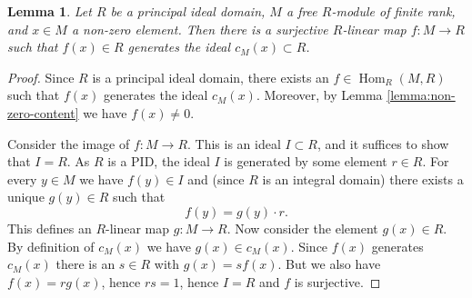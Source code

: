 \documentclass[11pt]{amsbook}
\DeclareMathOperator\Hom{Hom}
\theoremstyle{plain}
\newtheorem{lemma}[theorem]{Lemma}
\theoremstyle{definition}
\begin{document}
\begin{lemma}\label{lemma:content-division}
Let $R$ be a principal ideal domain, $M$ a free $R$-module of finite rank, and $x\in M$ a non-zero element.  Then
there is a surjective $R$-linear map $f\colon M\to R$ such that $f(x)\in R$ generates the ideal $c_M(x)\subset R$.
\end{lemma}

\begin{proof}
Since $R$ is a principal ideal domain, there exists an $f\in \Hom_R(M,R)$ such that $f(x)$ generates the ideal $c_M(x)$. Moreover, by Lemma \ref{lemma:non-zero-content} we have $f(x)\neq 0$.

Consider the image of $f\colon M\to R$. This is an ideal $I\subset R$, and it suffices to show that $I=R$. As $R$ is a PID, the ideal $I$ is generated by some element $r\in R$. For every $y \in M$ we have $f(y)\in I$ and (since $R$ is an integral domain) there exists a unique $g(y)\in R$ such that
\[
	f(y) = g(y) \cdot r.
\]
This defines an $R$-linear map $g\colon M\to R$. Now consider the element $g(x)\in R$. By definition of $c_M(x)$ we have $g(x)\in c_M(x)$. Since $f(x)$ generates $c_M(x)$ there is an $s\in R$ with $g(x)=sf(x)$. But we also have $f(x)=rg(x)$, hence $rs=1$, hence $I=R$ and $f$ is surjective.
\end{proof}
\end{document}
